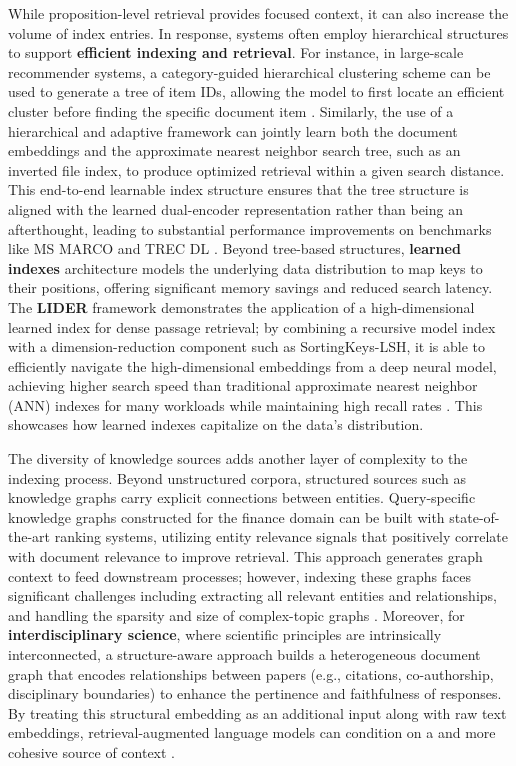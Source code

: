 \documentclass[11pt]{article}
\begin{document}
While proposition-level retrieval provides focused context, it can also increase the volume of index entries. In response, systems often employ hierarchical structures to support \textbf{efficient indexing and retrieval}. For instance, in large-scale recommender systems, a category-guided hierarchical clustering scheme can be used to generate a tree of item IDs, allowing the model to first locate an efficient cluster before finding the specific document item \cite{ref112}. Similarly, the use of a hierarchical and adaptive framework can jointly learn both the document embeddings and the approximate nearest neighbor search tree, such as an inverted file index, to produce optimized retrieval within a given search distance. This end-to-end learnable index structure ensures that the tree structure is aligned with the learned dual-encoder representation rather than being an afterthought, leading to substantial performance improvements on benchmarks like MS MARCO and TREC DL \cite{ref113}. Beyond tree-based structures, \textbf{learned indexes} architecture models the underlying data distribution to map keys to their positions, offering significant memory savings and reduced search latency. The \textbf{LIDER} framework demonstrates the application of a high-dimensional learned index for dense passage retrieval; by combining a recursive model index with a dimension-reduction component such as SortingKeys-LSH, it is able to efficiently navigate the high-dimensional embeddings from a deep neural model, achieving higher search speed than traditional approximate nearest neighbor (ANN) indexes for many workloads while maintaining high recall rates \cite{ref114}. This showcases how learned indexes capitalize on the data's distribution.

The diversity of knowledge sources adds another layer of complexity to the indexing process. Beyond unstructured corpora, structured sources such as knowledge graphs carry explicit connections between entities. Query-specific knowledge graphs constructed for the finance domain can be built with state-of-the-art ranking systems, utilizing entity relevance signals that positively correlate with document relevance to improve retrieval. This approach generates graph context to feed downstream processes; however, indexing these graphs faces significant challenges including extracting all relevant entities and relationships, and handling the sparsity and size of complex-topic graphs \cite{ref115}. Moreover, for \textbf{interdisciplinary science}, where scientific principles are intrinsically interconnected, a structure-aware approach builds a heterogeneous document graph that encodes relationships between papers (e.g., citations, co-authorship, disciplinary boundaries) to enhance the pertinence and faithfulness of responses. By treating this structural embedding as an additional input along with raw text embeddings, retrieval-augmented language models can condition on a and more cohesive source of context \cite{ref116}.
\end{document}
